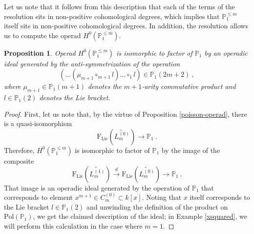 \documentclass[10pt, oneside]{amsart}
\theoremstyle{plain}
\newtheorem{proposition}[equation]{Proposition}
\newcommand{\f}{\mathrm{F}}
\newcommand{\lie}{\mathrm{Lie}}
\newcommand{\PP}{\mathbb{P}}
\newcommand{\pol}{\mathrm{Pol}}
\begin{document}
Let us note that it follows from this description that each of the terms of the resolution sits in non-positive cohomological
degrees, which implies that $\PP_1^{\le m}$ itself sits in non-positive cohomological degrees. In addition, the resolution allows us
to compute the operad $H^0(\PP_1^{\le m})$.
\begin{proposition}\label{model-classical-operad}
Operad $H^0(\PP_1^{\le m})$ is isomorphic to factor of $\PP_1$ by an operadic ideal generated by the anti-symmetrization of the
operation
\begin{equation*}
(\ldots (\mu_{m+1} \circ_{m+1} l) \ldots \circ_1 l) \in \PP_1(2m+2) \:,
\end{equation*}
where $\mu_{m+1} \in \PP_1(m+1)$ denotes the $m+1$-arity commutative product and $l \in \PP_1(2)$ denotes the Lie bracket.
\end{proposition}

\begin{proof}
First, let us note that, by the virtue of Proposition \ref{poisson-operad}, there is a quasi-isomorphism
\begin{equation*}
\f_\lie(\widetilde{L_m^{(0)}}) \longrightarrow \PP_1 \:.
\end{equation*}
Therefore, $H^0(\PP_1^{\le m})$ is isomorphic to factor of $\PP_1$ by the image of the composite
\begin{equation*}
\f_\lie(\widetilde{L_m^{(1)}}) \stackrel{d}{\longrightarrow} \f_\lie(\widetilde{L_m^{(0)}}) \longrightarrow \PP_1 \:.
\end{equation*}
That image is an operadic ideal generated by the operation of $\PP_1$ that corresponds to element $x^{m+1} \in C^{(0)}_m \subset k[x]$.
Noting that $x$ itself corresponds to the Lie bracket $l \in \PP_1(2)$ and unwinding the definition of the 
product on $\pol(\PP_1)$, we get the claimed description of the ideal; in Example \ref{xsquared}, we will perform this calculation in 
the case where $m = 1$.
\end{proof}
\end{document}
